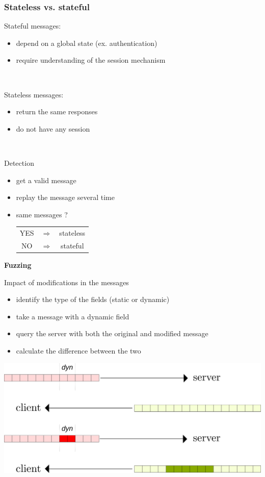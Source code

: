 \documentclass{beamer}
\newcounter{m} %
\newcounter{c} %
\begin{document}
\begin{frame}\frametitle{\bf Stateless vs. stateful}

  Stateful messages:
  \begin{itemize}
    \item depend on a global state (ex. authentication)
    \item require understanding of the session mechanism
  \end{itemize}

  ~

  Stateless messages: 
  \begin{itemize}
    \item return the same responses
    \item do not have any session
  \end{itemize}

  ~

  \begin{block}{Detection}
    \begin{itemize}
      \item get a valid message
      \item replay the message several time
      \item same messages ? \begin{tabular}{ccc}YES &$\Rightarrow$& stateless\\NO &$\Rightarrow$& stateful\end{tabular}
    \end{itemize}
  \end{block}
\end{frame}

\begin{frame}{\bf Fuzzing}

  Impact of modifications in the messages

  \begin{itemize}
    \item identify the type of the fields (static or dynamic)
    \item take a message with a dynamic field
    \item query the server with both the original and modified message
    \item calculate the difference between the two
  \end{itemize}

  \begin{center}\includegraphics[scale=0.4]{modify.png}\end{center}

\end{frame}
\end{document}
